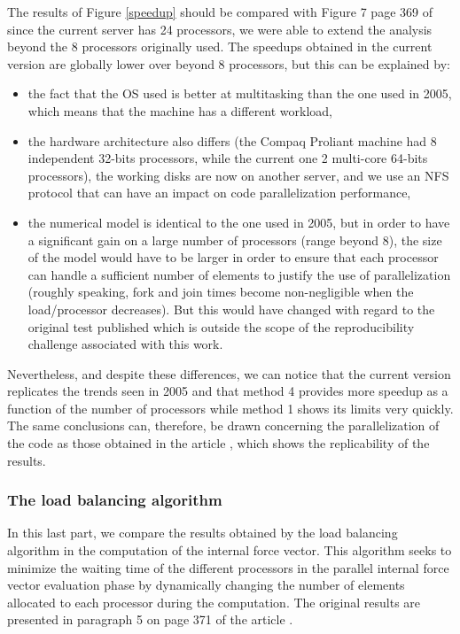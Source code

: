 The results of Figure \ref{speedup} should be compared with Figure 7 page 369 of \cite{Pantale:2005} since the current server has 24 processors, we were able to extend the analysis beyond the 8 processors originally used. The speedups obtained in the current version are globally lower over beyond 8 processors, but this can be explained by:
\begin{itemize}
\item the fact that the OS used is better at multitasking than the one used in 2005, which means that the machine has a different workload,
\item the hardware architecture also differs (the Compaq Proliant machine had 8 independent 32-bits processors, while the current one 2 multi-core 64-bits processors), the working disks are now on another server, and we use an NFS protocol that can have an impact on code parallelization performance,
\item the numerical model is identical to the one used in 2005, but in order to have a significant gain on a large number of processors (range beyond 8), the size of the model would have to be larger in order to ensure that each processor can handle a sufficient number of elements to justify the use of parallelization (roughly speaking, fork and join times become non-negligible when the load/processor decreases). But this would have changed with regard to the original test published which is outside the scope of the reproducibility challenge associated with this work.
\end{itemize}
Nevertheless, and despite these differences, we can notice that the current version replicates the trends seen in 2005 and that method 4 provides more speedup as a function of the number of processors while method 1 shows its limits very quickly. The same conclusions can, therefore, be drawn concerning the parallelization of the code as those obtained in the article \cite{Pantale:2005}, which shows the replicability of the results.

\subsubsection{The load balancing algorithm}

In this last part, we compare the results obtained by the load balancing algorithm in the computation of the internal force vector. This algorithm seeks to minimize the waiting time of the different processors in the parallel internal force vector evaluation phase by dynamically changing the number of elements allocated to each processor during the computation. The original results are presented in paragraph 5 on page 371 of the article \cite{Pantale:2005}.

